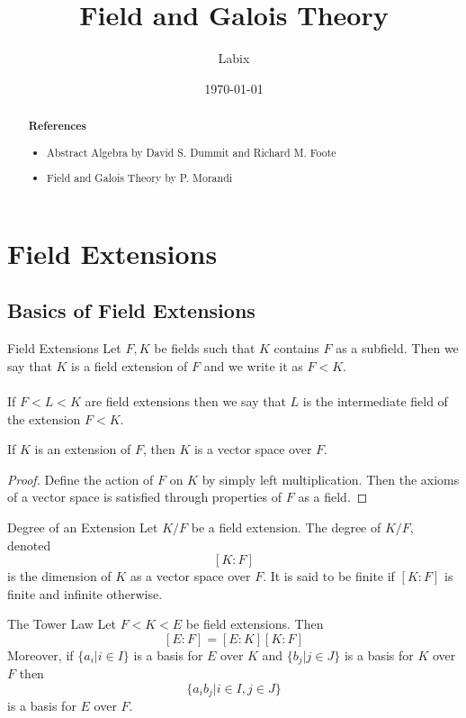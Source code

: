 \documentclass[a4paper]{article}
\title{Field and Galois Theory}
\author{Labix}
\date{\today}
\begin{document}
\maketitle
\begin{abstract}

\textbf{References}
\begin{itemize}
\item Abstract Algebra by David S. Dummit and Richard M. Foote
\item Field and Galois Theory by P. Morandi
\end{itemize}
\end{abstract}
\pagebreak
\tableofcontents

\pagebreak
\section{Field Extensions}
\subsection{Basics of Field Extensions}
\begin{defn}{Field Extensions}{} Let $F,K$ be fields such that $K$ contains $F$ as a subfield. Then we say that $K$ is a field extension of $F$ and we write it as $F<K$. \\~\\
If $F<L<K$ are field extensions then we say that $L$ is the intermediate field of the extension $F<K$. 
\end{defn}

\begin{prp}{}{} If $K$ is an extension of $F$, then $K$ is a vector space over $F$. \tcbline
\begin{proof}
Define the action of $F$ on $K$ by simply left multiplication. Then the axioms of a vector space is satisfied through properties of $F$ as a field. 
\end{proof}
\end{prp}

\begin{defn}{Degree of an Extension}{} Let $K/F$ be a field extension. The degree of $K/F$, denoted $$[K:F]$$ is the dimension of $K$ as a vector space over $F$. It is said to be finite if $[K:F]$ is finite and infinite otherwise. 
\end{defn}

\begin{prp}{The Tower Law}{} Let $F<K<E$ be field extensions. Then $$[E:F]=[E:K][K:F]$$ Moreover, if $\{a_i|i\in I\}$ is a basis for $E$ over $K$ and $\{b_j|j\in J\}$ is a basis for $K$ over $F$ then $$\{a_ib_j|i\in I, j\in J\}$$ is a basis for $E$ over $F$. 
\end{prp}
\end{document}
